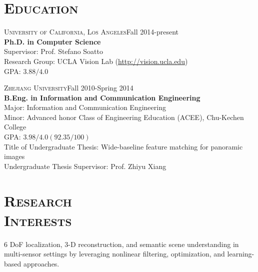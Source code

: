 \documentclass[margin, line, 10pt]{res} %
\begin{document}
\begin{resume}


%


\section{\textsc{Education}}
\textsc{University of California, Los Angeles}\hfill{Fall 2014-present}\\
{\bf Ph.D. in Computer Science}\\
Supervisor: Prof. Stefano Soatto\\
Research Group: UCLA Vision Lab (\url{http://vision.ucla.edu})\\
GPA: $3.88/4.0$

\textsc{Zhejiang University}\hfill{Fall 2010-Spring 2014}\\
{\bf B.Eng. in Information and Communication Engineering}\\
Major: Information and Communication Engineering\\
Minor: Advanced honor Class of Engineering Education (ACEE), Chu-Kechen College\\
GPA: $3.98/4.0 (92.35/100)$\\
Title of Undergraduate Thesis: Wide-baseline feature matching for panoramic images\\
Undergraduate Thesis Supervisor: Prof. Zhiyu Xiang

\section{\textsc{Research\\Interests}}
6 DoF localization, 3-D reconstruction, and semantic scene understanding in multi-sensor settings by leveraging nonlinear filtering, optimization, and learning-based approaches.


\end{resume}
\end{document}
